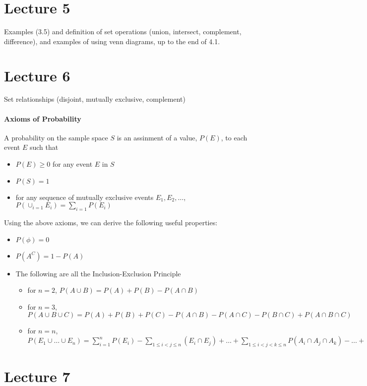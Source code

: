 \documentclass[10pt,letter]{article}
\begin{document}
\section*{Lecture 5}
Examples (3.5) and definition of set operations (union, intersect, complement, difference), and examples of using venn diagrams, up to the end of 4.1.

\section*{Lecture 6}
Set relationships (disjoint, mutually exclusive, complement) 
\paragraph{Axioms of Probability}
A probability on the sample space $S$ is an assinment of a value, $P(E)$, to each event $E$ such that \begin{itemize}
    \item $P(E)\geq0$ for any event $E$ in $S$ 
    \item $P(S)=1$ 
    \item for any sequence of mutually exclusive events $E_1,E_2,\ldots$, $P(\cup_{i=1}E_i)=\sum_{i=1}P(E_i)$ 
\end{itemize} 
Using the above axioms, we can derive the following useful properties: 
\begin{itemize}
    \item $P(\phi)=0$ 
    \item $P(A^C)=1-P(A)$
    \item The following are all the Inclusion-Exclusion Principle
    \begin{itemize}
        \item for $n=2$, $P(A\cup B)=P(A)+P(B)-P(A\cap B)$ 
        \item for $n=3$, $P(A\cup B\cup C)=P(A)+P(B)+P(C)-P(A\cap B)-P(A\cap C)-P(B\cap C)+P(A\cap B\cap C)$ 
        \item for $n=n$, $P(E_1\cup\ldots\cup E_n)=\sum_{i=1}^nP(E_i)-\sum_{1\leq i<j\leq n}(E_{i}\cap E_{j})+\ldots+\sum_{1\leq i<j<k\leq n}P(A_i\cap A_j\cap A_k)-\ldots+(-1)^{n-1}P(E_1\cap\ldots\cap E_n)$
    \end{itemize}
\end{itemize}

\section*{Lecture 7}
\end{document}
